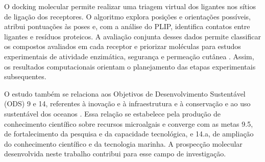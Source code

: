 O docking molecular permite realizar uma triagem virtual dos ligantes nos sítios de ligação dos receptores. O algoritmo explora posições e orientações possíveis, atribui pontuações às poses e, com a análise do PLIP, identifica contatos entre ligantes e resíduos proteicos. A avaliação conjunta desses dados permite classificar os compostos avaliados em cada receptor e priorizar moléculas para estudos experimentais de atividade enzimática, segurança e permeação cutânea \parencite{salentin2015plip,trott2010,warren2006}. Assim, os resultados computacionais orientam o planejamento das etapas experimentais subsequentes.

O estudo também se relaciona aos Objetivos de Desenvolvimento Sustentável (ODS) 9 e 14, referentes à inovação e à infraestrutura e à conservação e ao uso sustentável dos oceanos \parencite{onu2015agenda}. Essa relação se estabelece pela produção de conhecimento científico sobre recursos microalgais e converge com as metas 9.5, de fortalecimento da pesquisa e da capacidade tecnológica, e 14.a, de ampliação do conhecimento científico e da tecnologia marinha. A prospecção molecular desenvolvida neste trabalho contribui para esse campo de investigação.
